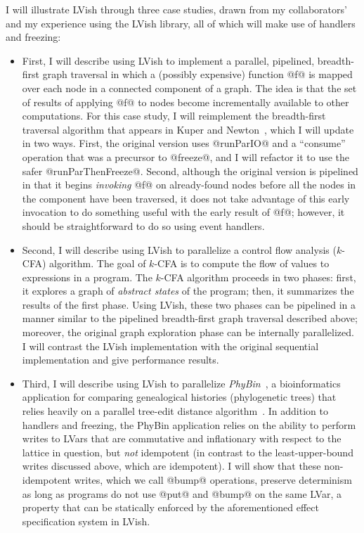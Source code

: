 I will illustrate LVish through three case studies, drawn from my
collaborators' and my experience using the LVish library, all of which
will make use of handlers and freezing:
\begin{itemize}
\item First, I will describe using LVish to implement a parallel,
  pipelined, breadth-first graph traversal in which a (possibly
  expensive) function @f@ is mapped over each node in a connected
  component of a graph.  The idea is that the set of results of
  applying @f@ to nodes become incrementally available to other
  computations.  For this case study, I will reimplement the
  breadth-first traversal algorithm that appears in Kuper and
  Newton~\cite{LVars-paper}, which I will update in two ways.  First,
  the original version uses @runParIO@ and a ``consume'' operation
  that was a precursor to @freeze@, and I will refactor it to use the
  safer @runParThenFreeze@.  Second, although the original version is
  pipelined in that it begins \emph{invoking} @f@ on already-found
  nodes before all the nodes in the component have been traversed, it
  does not take advantage of this early invocation to do something
  useful with the early result of @f@; however, it should be
  straightforward to do so using event handlers.
\item Second, I will describe using LVish to parallelize a control
  flow analysis ($k$-CFA) algorithm.  The goal of $k$-CFA is to
  compute the flow of values to expressions in a program.  The $k$-CFA
  algorithm proceeds in two phases: first, it explores a graph of
  \emph{abstract states} of the program; then, it summarizes the
  results of the first phase.  Using LVish, these two phases can be
  pipelined in a manner similar to the pipelined breadth-first graph
  traversal described above; moreover, the original graph exploration
  phase can be internally parallelized.  I will contrast the LVish
  implementation with the original sequential implementation and give
  performance results.
\item Third, I will describe using LVish to parallelize
  \emph{PhyBin}~\cite{PhyBin}, a bioinformatics application for
  comparing genealogical histories (phylogenetic trees) that relies
  heavily on a parallel tree-edit distance algorithm~\cite{hashrf}.
  In addition to handlers and freezing, the PhyBin application relies
  on the ability to perform writes to LVars that are commutative and
  inflationary with respect to the lattice in question, but \emph{not}
  idempotent (in contrast to the least-upper-bound writes discussed
  above, which are idempotent).  I will show that these non-idempotent
  writes, which we call @bump@ operations, preserve determinism as
  long as programs do not use @put@ and @bump@ on the same LVar, a
  property that can be statically enforced by the aforementioned
  effect specification system in LVish.
\end{itemize}

